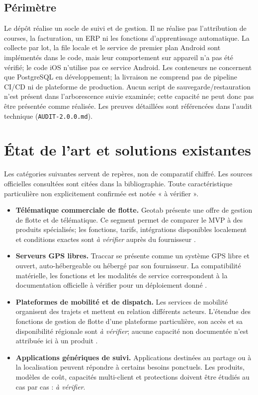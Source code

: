 \documentclass[12pt,a4paper]{article}
\begin{document}
\subsection{Périmètre}
Le dépôt réalise un socle de suivi et de gestion. Il ne réalise pas l'attribution de courses, la facturation, un ERP ni les fonctions d'apprentissage automatique. La collecte par lot, la file locale et le service de premier plan Android sont implémentés dans le code, mais leur comportement sur appareil n'a pas été vérifié; le code iOS n'utilise pas ce service Android. Les conteneurs ne concernent que PostgreSQL en développement; la livraison ne comprend pas de pipeline CI/CD ni de plateforme de production. Aucun script de sauvegarde/restauration n'est présent dans l'arborescence suivie examinée; cette capacité ne peut donc pas être présentée comme réalisée. Les preuves détaillées sont référencées dans l'audit technique (\texttt{AUDIT-2.0.0.md}).

\section{État de l'art et solutions existantes}

Les catégories suivantes servent de repères, non de comparatif chiffré. Les sources officielles consultées sont citées dans la bibliographie. Toute caractéristique particulière non explicitement confirmée est notée « à vérifier ».

\begin{itemize}
\item \textbf{Télématique commerciale de flotte.} Geotab présente une offre de gestion de flotte et de télématique. Ce segment permet de comparer le MVP à des produits spécialisés; les fonctions, tarifs, intégrations disponibles localement et conditions exactes sont \emph{à vérifier} auprès du fournisseur \cite{geotab}.
\item \textbf{Serveurs GPS libres.} Traccar se présente comme un système GPS libre et ouvert, auto-hébergeable ou hébergé par son fournisseur. La compatibilité matérielle, les fonctions et les modalités de service correspondent à la documentation officielle à vérifier pour un déploiement donné \cite{traccar}.
\item \textbf{Plateformes de mobilité et de dispatch.} Les services de mobilité organisent des trajets et mettent en relation différents acteurs. L'étendue des fonctions de gestion de flotte d'une plateforme particulière, son accès et sa disponibilité régionale sont \emph{à vérifier}; aucune capacité non documentée n'est attribuée ici à un produit \cite{uber}.
\item \textbf{Applications génériques de suivi.} Applications destinées au partage ou à la localisation peuvent répondre à certains besoins ponctuels. Les produits, modèles de coût, capacités multi-client et protections doivent être étudiés au cas par cas : \emph{à vérifier}.
\end{itemize}
\end{document}
